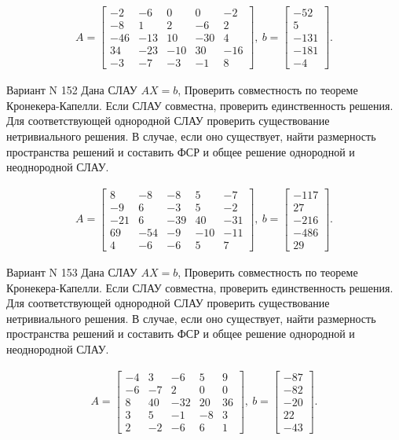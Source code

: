 \documentclass[11pt]{report}
\begin{document}
\begin{align*}
 A = \left[\begin{matrix}-2 & -6 & 0 & 0 & -2\\-8 & 1 & 2 & -6 & 2\\-46 & -13 & 10 & -30 & 4\\34 & -23 & -10 & 30 & -16\\-3 & -7 & -3 & -1 & 8\end{matrix}\right],
\ b = \left[\begin{matrix}-52\\5\\-131\\-181\\-4\end{matrix}\right]. 
 \end{align*}

Вариант N 152
Дана СЛАУ $AX = b$,
Проверить совместность по теореме Кронекера-Капелли. Если СЛАУ совместна, проверить единственность решения.
Для соответствующей однородной СЛАУ проверить существование нетривиального решения. В случае, если оно существует,
найти размерность пространства решений и составить ФСР и общее решение однородной  и неоднородной СЛАУ.


\begin{align*}
 A = \left[\begin{matrix}8 & -8 & -8 & 5 & -7\\-9 & 6 & -3 & 5 & -2\\-21 & 6 & -39 & 40 & -31\\69 & -54 & -9 & -10 & -11\\4 & -6 & -6 & 5 & 7\end{matrix}\right],
\ b = \left[\begin{matrix}-117\\27\\-216\\-486\\29\end{matrix}\right]. 
 \end{align*}

Вариант N 153
Дана СЛАУ $AX = b$,
Проверить совместность по теореме Кронекера-Капелли. Если СЛАУ совместна, проверить единственность решения.
Для соответствующей однородной СЛАУ проверить существование нетривиального решения. В случае, если оно существует,
найти размерность пространства решений и составить ФСР и общее решение однородной  и неоднородной СЛАУ.


\begin{align*}
 A = \left[\begin{matrix}-4 & 3 & -6 & 5 & 9\\-6 & -7 & 2 & 0 & 0\\8 & 40 & -32 & 20 & 36\\3 & 5 & -1 & -8 & 3\\2 & -2 & -6 & 6 & 1\end{matrix}\right],
\ b = \left[\begin{matrix}-87\\-82\\-20\\22\\-43\end{matrix}\right]. 
 \end{align*}
\end{document}
